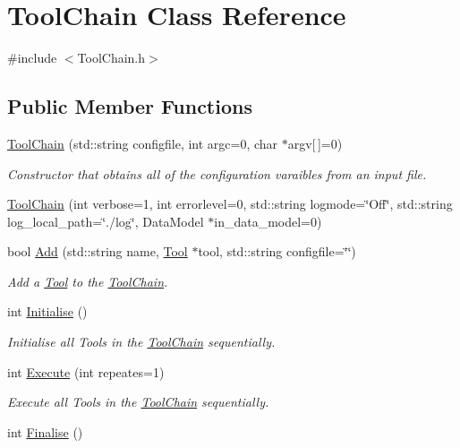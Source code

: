 \hypertarget{classToolChain}{\section{Tool\-Chain Class Reference}
\label{classToolChain}
}


{\ttfamily \#include $<$Tool\-Chain.\-h$>$}

\subsection*{Public Member Functions}
\begin{DoxyCompactItemize}
\item 
\hyperlink{classToolChain_a133e224899a743ee4a679396f8569bf9}{Tool\-Chain} (std\-::string configfile, int argc=0, char $\ast$argv\mbox{[}$\,$\mbox{]}=0)
\begin{DoxyCompactList}\small\item\em Constructor that obtains all of the configuration varaibles from an input file. \end{DoxyCompactList}\item 
\hyperlink{classToolChain_aba22fc00bab0c21c7162ef9a22f69940}{Tool\-Chain} (int verbose=1, int errorlevel=0, std\-::string logmode=\char`\"{}Off\char`\"{}, std\-::string log\-\_\-local\-\_\-path=\char`\"{}./log\char`\"{}, Data\-Model $\ast$in\-\_\-data\-\_\-model=0)
\item 
bool \hyperlink{classToolChain_ae6859092e14be1f9538c50d7c838fe8e}{Add} (std\-::string name, \hyperlink{classTool}{Tool} $\ast$tool, std\-::string configfile=\char`\"{}\char`\"{})
\begin{DoxyCompactList}\small\item\em Add a \hyperlink{classTool}{Tool} to the \hyperlink{classToolChain}{Tool\-Chain}. \end{DoxyCompactList}\item 
\hypertarget{classToolChain_a341f343926341b82a29c586a7b9683af}{int \hyperlink{classToolChain_a341f343926341b82a29c586a7b9683af}{Initialise} ()}\label{classToolChain_a341f343926341b82a29c586a7b9683af}

\begin{DoxyCompactList}\small\item\em Initialise all Tools in the \hyperlink{classToolChain}{Tool\-Chain} sequentially. \end{DoxyCompactList}\item 
int \hyperlink{classToolChain_a303e299293fd4d3a5e91865e04898e52}{Execute} (int repeates=1)
\begin{DoxyCompactList}\small\item\em Execute all Tools in the \hyperlink{classToolChain}{Tool\-Chain} sequentially. \end{DoxyCompactList}\item 
\hypertarget{classToolChain_a3828756135773fb9ca4b361a47296dd9}{int \hyperlink{classToolChain_a3828756135773fb9ca4b361a47296dd9}{Finalise} ()}\label{classToolChain_a3828756135773fb9ca4b361a47296dd9}


\end{DoxyCompactItemize}
